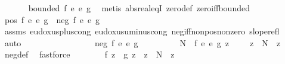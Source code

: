 \begin{isabellebody}
\ \ \ \ \isamarkupfalse%
\ {\isachardoublequoteopen}{\isasymnot}\ bounded\ {\isacharparenleft}{\kern0pt}f\ {\isacharplus}{\kern0pt}\isactrlsub e\ {\isacharminus}{\kern0pt}\isactrlsub e\ g{\isacharparenright}{\kern0pt}{\isachardoublequoteclose}\ \isamarkupfalse%
\ {\isacharparenleft}{\kern0pt}metis\ abs{\isacharunderscore}{\kern0pt}real{\isacharunderscore}{\kern0pt}eqI\ zero{\isacharunderscore}{\kern0pt}def\ zero{\isacharunderscore}{\kern0pt}iff{\isacharunderscore}{\kern0pt}bounded{\isacharparenright}{\kern0pt}\isanewline
\ \ \ \ \isamarkupfalse%
\ {\isachardoublequoteopen}pos\ {\isacharparenleft}{\kern0pt}f\ {\isacharplus}{\kern0pt}\isactrlsub e\ {\isacharminus}{\kern0pt}\isactrlsub e\ g{\isacharparenright}{\kern0pt}\ {\isasymor}\ neg\ {\isacharparenleft}{\kern0pt}f\ {\isacharplus}{\kern0pt}\isactrlsub e\ {\isacharminus}{\kern0pt}\isactrlsub e\ g{\isacharparenright}{\kern0pt}{\isachardoublequoteclose}\ \isamarkupfalse%
\ assms\ eudoxus{\isacharunderscore}{\kern0pt}plus{\isacharunderscore}{\kern0pt}cong\ eudoxus{\isacharunderscore}{\kern0pt}uminus{\isacharunderscore}{\kern0pt}cong\ neg{\isacharunderscore}{\kern0pt}iff{\isacharunderscore}{\kern0pt}nonpos{\isacharunderscore}{\kern0pt}nonzero\ slope{\isacharunderscore}{\kern0pt}refl\ \isamarkupfalse%
\ auto\isanewline
\ \ \ \ \isamarkupfalse%
\isanewline
\ \ \ \ \isacommand{{\isacharbraceleft}{\kern0pt}}\isamarkupfalse%
\isanewline
\ \ \ \ \ \ \isamarkupfalse%
\ {\isachardoublequoteopen}neg\ {\isacharparenleft}{\kern0pt}f\ {\isacharplus}{\kern0pt}\isactrlsub e\ {\isacharminus}{\kern0pt}\isactrlsub e\ g{\isacharparenright}{\kern0pt}{\isachardoublequoteclose}\isanewline
\ \ \ \ \ \ \isamarkupfalse%
\ \isamarkupfalse%
\ N{\isacharprime}{\kern0pt}\ \ {\isachardoublequoteopen}{\isacharparenleft}{\kern0pt}f\ {\isacharplus}{\kern0pt}\isactrlsub e\ {\isacharminus}{\kern0pt}\isactrlsub e\ g{\isacharparenright}{\kern0pt}\ z\ {\isasymle}\ {\isacharminus}{\kern0pt}\ {}{\isachardoublequoteclose}\ \ {\isachardoublequoteopen}z\ {\isasymge}\ N{\isacharprime}{\kern0pt}{\isachardoublequoteclose}\ \ z\ \isamarkupfalse%
\ neg{\isacharunderscore}{\kern0pt}def\ \isamarkupfalse%
\ fastforce\isanewline
\ \ \ \ \ \ \isamarkupfalse%
\ {\isachardoublequoteopen}f\ z\ {\isacharless}{\kern0pt}\ g\ z{\isachardoublequoteclose}\ \ {\isachardoublequoteopen}z\ {\isasymge}\ N{\isacharprime}{\kern0pt}{\isachardoublequoteclose}\ \ z\ \isamarkupfalse%

\end{isabellebody}
